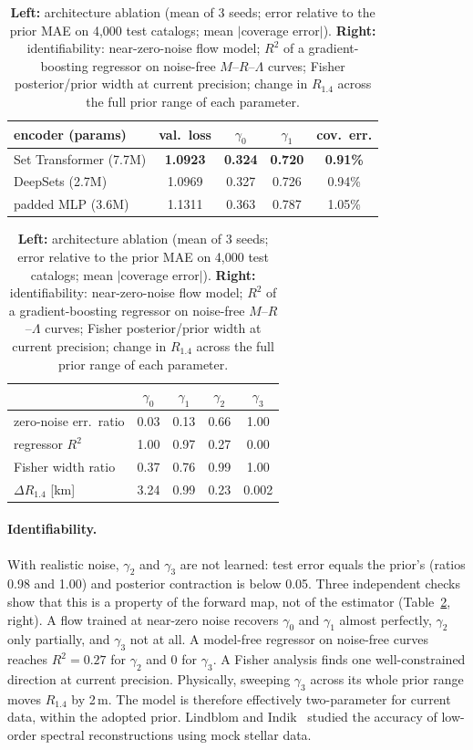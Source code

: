 \documentclass{article}
\begin{document}
\begin{table}[t]
\caption{\textbf{Left:} architecture ablation (mean of 3 seeds; error relative to the prior MAE on 4,000 test catalogs; mean $|$coverage error$|$). \textbf{Right:} identifiability: near-zero-noise flow model; $R^2$ of a gradient-boosting regressor \citep{friedman2001greedy} on noise-free $M$--$R$--$\Lambda$ curves; Fisher posterior/prior width at current precision; change in $R_{1.4}$ across the full prior range of each parameter.}
\label{tab:ablate}
\centering\footnotesize\setlength\tabcolsep{3.5pt}
\begin{tabular}{lcccc}
\toprule
encoder (params) & val.\ loss & $\gamma_0$ & $\gamma_1$ & cov.\ err. \\
\midrule
Set Transformer (7.7M) & \textbf{1.0923} & \textbf{0.324} & \textbf{0.720} & \textbf{0.91\%} \\
DeepSets (2.7M) & 1.0969 & 0.327 & 0.726 & 0.94\% \\
padded MLP (3.6M) & 1.1311 & 0.363 & 0.787 & 1.05\% \\
\bottomrule
\end{tabular}\hfill
\begin{tabular}{lcccc}
\toprule
 & $\gamma_0$ & $\gamma_1$ & $\gamma_2$ & $\gamma_3$ \\
\midrule
zero-noise err.\ ratio & 0.03 & 0.13 & 0.66 & 1.00 \\
regressor $R^2$ & 1.00 & 0.97 & 0.27 & 0.00 \\
Fisher width ratio & 0.37 & 0.76 & 0.99 & 1.00 \\
$\Delta R_{1.4}$ [km] & 3.24 & 0.99 & 0.23 & 0.002 \\
\bottomrule
\end{tabular}
\end{table}

\paragraph{Identifiability.} With realistic noise, $\gamma_2$ and $\gamma_3$ are not learned: test error equals the prior's (ratios 0.98 and 1.00) and posterior contraction is below 0.05. Three independent checks show that this is a property of the forward map, not of the estimator (Table~\ref{tab:ablate}, right). A flow trained at near-zero noise recovers $\gamma_0$ and $\gamma_1$ almost perfectly, $\gamma_2$ only partially, and $\gamma_3$ not at all. A model-free regressor on noise-free curves reaches $R^2=0.27$ for $\gamma_2$ and $0$ for $\gamma_3$. A Fisher analysis finds one well-constrained direction at current precision. Physically, sweeping $\gamma_3$ across its whole prior range moves $R_{1.4}$ by 2\,m. The model is therefore effectively two-parameter for current data, within the adopted prior. Lindblom and Indik~\citep{lindblom2014spectral} studied the accuracy of low-order spectral reconstructions using mock stellar data.
\end{document}
